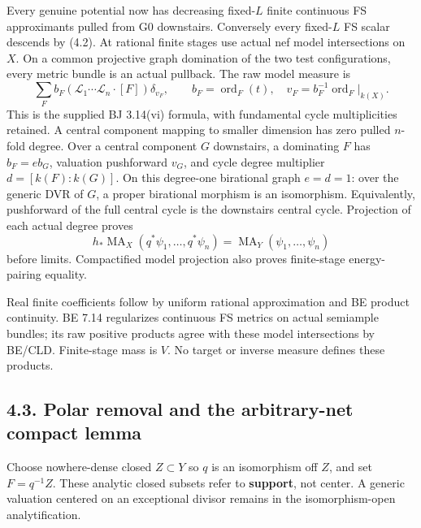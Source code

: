 \documentclass[
  10pt,
]{article}
\begin{document}
Every genuine potential now has decreasing fixed-\(L\) finite continuous
FS approximants pulled from G0 downstairs. Conversely every fixed-\(L\)
FS scalar descends by (4.2). At rational finite stages use actual nef
model intersections on \(X\). On a common projective graph domination of
the two test configurations, every metric bundle is an actual pullback.
The raw model measure is
\[\sum_F b_F(\mathcal L_1\cdots\mathcal L_n\cdot[F])\delta_{v_F},
\qquad b_F=\operatorname{ord}_F(t),\quad
v_F=b_F^{-1}\operatorname{ord}_F|_{k(X)}. \tag{4.4}\] This is the
supplied BJ 3.14(vi) formula, with fundamental cycle multiplicities
retained. A central component mapping to smaller dimension has zero
pulled \(n\)-fold degree. Over a central component \(G\) downstairs, a
dominating \(F\) has \(b_F=e b_G\), valuation pushforward \(v_G\), and
cycle degree multiplier \(d=[k(F):k(G)]\). On this degree-one birational
graph \(e=d=1\): over the generic DVR of \(G\), a proper birational
morphism is an isomorphism. Equivalently, pushforward of the full
central cycle is the downstairs central cycle. Projection of each actual
degree proves \[h_*\operatorname{MA}_X(q^*\psi_1,\ldots,q^*\psi_n)
=\operatorname{MA}_Y(\psi_1,\ldots,\psi_n) \tag{4.5}\] before limits.
Compactified model projection also proves finite-stage energy-pairing
equality.

Real finite coefficients follow by uniform rational approximation and BE
product continuity. BE 7.14 regularizes continuous FS metrics on actual
semiample bundles; its raw positive products agree with these model
intersections by BE/CLD. Finite-stage mass is \(V\). No target or
inverse measure defines these products.

\subsection{4.3. Polar removal and the arbitrary-net compact
lemma}\label{polar-removal-and-the-arbitrary-net-compact-lemma}

Choose nowhere-dense closed \(Z\subset Y\) so \(q\) is an isomorphism
off \(Z\), and set \(F=q^{-1}Z\). These analytic closed subsets refer to
\textbf{support}, not center. A generic valuation centered on an
exceptional divisor remains in the isomorphism-open analytification.
\end{document}
